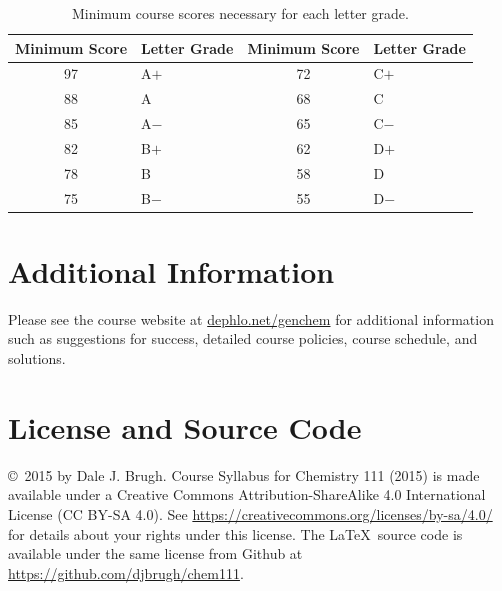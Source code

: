 \documentclass[letterpaper,oneside,onecolumn,11pt,article]{memoir}
\begin{document}
\begin{table}[h]
\caption{\sffamily Minimum course scores necessary for each letter grade.}
\label{tab:lettergrades}
\begin{tabular}{cl||cl} \toprule
\textbf{Minimum Score} & \textbf{Letter Grade} & \textbf{Minimum Score} & \textbf{Letter Grade} \\ \hline
97 & \hspace{0.3in}A$+$ & 72 & \hspace{0.3in}C$+$ \\
88 & \hspace{0.3in}A & 68 & \hspace{0.3in}C \\
85 & \hspace{0.3in}A$-$ & 65 & \hspace{0.3in}C$-$ \\
82 & \hspace{0.3in}B$+$ & 62 & \hspace{0.3in}D$+$ \\
78 & \hspace{0.3in}B & 58 & \hspace{0.3in}D \\
75 & \hspace{0.3in}B$-$ & 55 & \hspace{0.3in}D$-$ \\
\bottomrule
\end{tabular}
\end{table}

\section{Additional Information}

Please see the course website at \href{http://dephlo.net/genchem}{dephlo.net/genchem} for additional information such as suggestions for success, detailed course policies, course schedule, and solutions. 

\section{License and Source Code}
\copyright\ 2015 by Dale J. Brugh. Course Syllabus for Chemistry 111 (2015) is made available under a Creative Commons Attribution-ShareAlike 4.0 International License (CC BY-SA 4.0). See \href{https://creativecommons.org/licenses/by-sa/4.0/}{https://creativecommons.org/licenses/by-sa/4.0/} for details about your rights under this license. The \LaTeX\ source code is available under the same license from Github at \href{https://github.com/djbrugh/chem111}{https://github.com/djbrugh/chem111}. 
\end{document}
